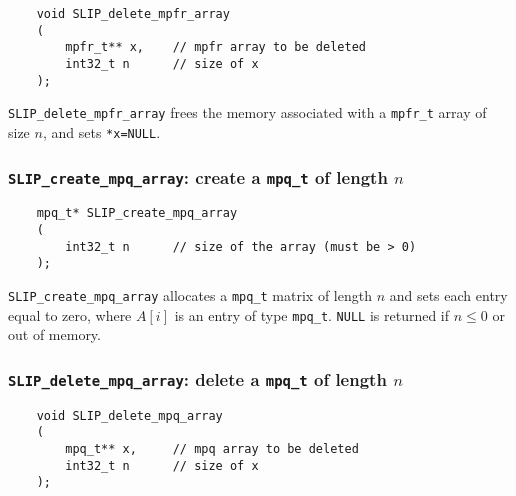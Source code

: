 \documentclass[12pt]{article}
\theoremstyle{definition}
\begin{document}
\begin{mdframed}[userdefinedwidth=6in]
{\footnotesize
\begin{verbatim}
    void SLIP_delete_mpfr_array
    (
        mpfr_t** x,    // mpfr array to be deleted
        int32_t n      // size of x
    );
\end{verbatim}
} \end{mdframed}

\verb|SLIP_delete_mpfr_array| frees the memory associated with a \verb|mpfr_t|
array of size $n$, and sets \verb|*x=NULL|.

\cprotect\subsubsection{\verb|SLIP_create_mpq_array|: create a \verb|mpq_t| of length $n$}

\begin{mdframed}[userdefinedwidth=6in]
{\footnotesize
\begin{verbatim}
    mpq_t* SLIP_create_mpq_array
    (
        int32_t n      // size of the array (must be > 0)
    );
\end{verbatim}
} \end{mdframed}


\verb|SLIP_create_mpq_array| allocates a \verb|mpq_t| matrix of length $n$ and
sets each entry equal to zero, where  $A[i]$ is an entry of type \verb|mpq_t|.
 \verb|NULL| is returned if
$n\le 0$ or out of memory.

\cprotect\subsubsection{\verb|SLIP_delete_mpq_array|: delete a \verb|mpq_t| of length $n$}

\begin{mdframed}[userdefinedwidth=6in]
{\footnotesize
\begin{verbatim}
    void SLIP_delete_mpq_array
    (
        mpq_t** x,     // mpq array to be deleted
        int32_t n      // size of x
    );
\end{verbatim}
} \end{mdframed}
\end{document}
